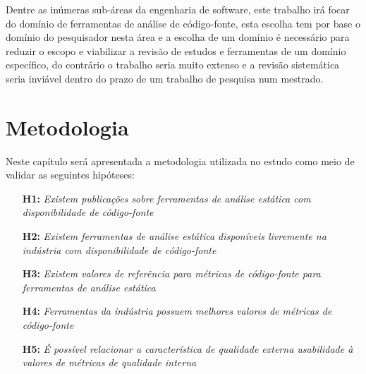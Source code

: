\documentclass[qual, classic, a4paper]{ufbathesis}
\begin{document}
Dentre as inúmeras sub-áreas da engenharia de software, este trabalho irá
focar do domínio de ferramentas de análise de código-fonte, esta escolha tem
por base o domínio do pesquisador nesta área e a escolha de um domínio é
necessário para reduzir o escopo e viabilizar a revisão de estudos e
ferramentas de um domínio específico, do contrário o trabalho seria muito
extenso e a revisão sistemática seria inviável dentro do prazo de um trabalho
de pesquisa num mestrado.

\chapter{Metodologia}

%
%

Neste capítulo será apresentada a metodologia utilizada no estudo como meio
de validar as seguintes hipóteses:

\begin{enumerate}
  \item[{\bf H1:}] {\em Existem publicações sobre ferramentas de análise
    estática com disponibilidade de código-fonte}
  \item[{\bf H2:}] {\em Existem ferramentas de análise estática disponíveis
    livremente na indústria com disponibilidade de código-fonte}
  \item[{\bf H3:}] {\em Existem valores de referência para métricas de
    código-fonte para ferramentas de análise estática}
  \item[{\bf H4:}] {\em Ferramentas da indústria possuem melhores valores de
    métricas de código-fonte}
  \item[{\bf H5:}] {\em É possível relacionar a característica de qualidade
    externa usabilidade à valores de métricas de qualidade interna}
\end{enumerate}
\end{document}
